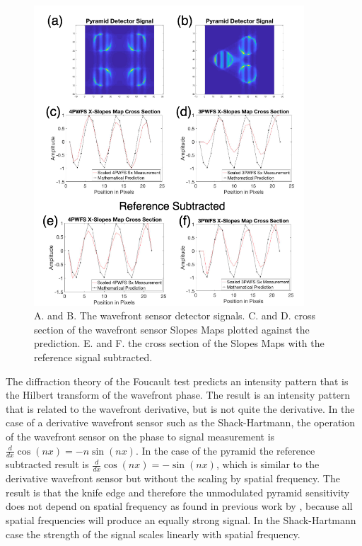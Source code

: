 \begin{figure}
    \centering
    \includegraphics[width=0.9\textwidth]{Chapter Materials/Chapter Two Materials/Mod0PredictionVsSIm.png}
    \caption{A. and B. The wavefront sensor detector signals. C. and D. cross section of the wavefront sensor Slopes Maps plotted against the prediction. E. and F. the cross section of the Slopes Maps with the reference signal subtracted.}
    \label{fig:Mod0}
\end{figure}

The diffraction theory of the Foucault test predicts an intensity pattern that is the Hilbert transform of the wavefront phase. The result is an intensity pattern that is related to the wavefront derivative, but is not quite the derivative. In the case of a derivative wavefront sensor such as the Shack-Hartmann, the operation of the wavefront sensor on the phase to signal measurement is $\frac{d}{dx}\cos(nx)=-n\sin(nx)$. In the case of the pyramid the reference subtracted result is  $\frac{d}{dx}\cos(nx)=-\sin(nx)$, which is similar to the derivative wavefront sensor but without the scaling by spatial frequency. The result is that the knife edge and therefore the unmodulated pyramid sensitivity does not depend on spatial frequency as found in previous work by \cite{guyon2005}, because all spatial frequencies will produce an equally strong signal. In the Shack-Hartmann case the strength of the signal scales linearly with spatial frequency.


